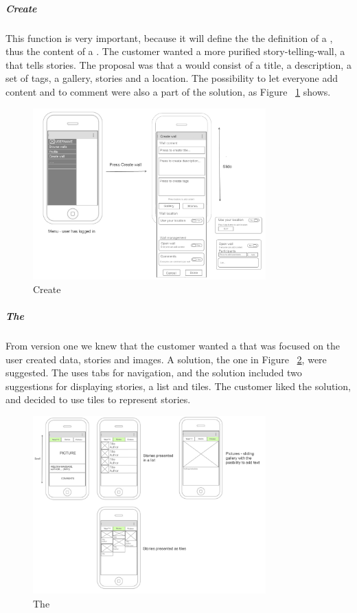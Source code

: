 \documentclass[11pt]{book}
\begin{document}
\subparagraph{Create \wallentitys}
This function is very important, because it will define the the definition of a \wallentitys, thus the content of a \wallentitys. The customer wanted a more purified story-telling-wall, a \wallentitys that tells stories. The proposal was that a \wallentitys would consist of a title, a description, a set of tags, a gallery, stories and a location. The possibility to let everyone add content and to comment were also a part of the solution, as Figure ~\ref{fig:phases_sprint1_uiVersionTwoCreateWallDocument} shows.

\begin{figure}[H]
    \centering
    \includegraphics[width=0.8\textwidth]{Figures/Phases/Sprint1/createWallDocument.png}
    \caption{Create \wallentitys}
    \label{fig:phases_sprint1_uiVersionTwoCreateWallDocument}
\end{figure}

\subparagraph{The \wallentitys}
From version one we knew that the customer wanted a \wallentitys that was focused on the user created data, stories and images. A solution, the one in Figure ~\ref{fig:phases_sprint1_uiVersionTwoWallFunctions}, were suggested. The \wallentitys uses tabs for navigation, and the solution included two suggestions for displaying stories, a list and tiles. The customer liked the solution, and decided to use tiles to represent stories.

\begin{figure}[H]
    \centering
    \includegraphics[width=0.8\textwidth]{Figures/Phases/Sprint1/wallFunctions.png}
    \caption{The \wallentitys}
    \label{fig:phases_sprint1_uiVersionTwoWallFunctions}
\end{figure}
\end{document}
